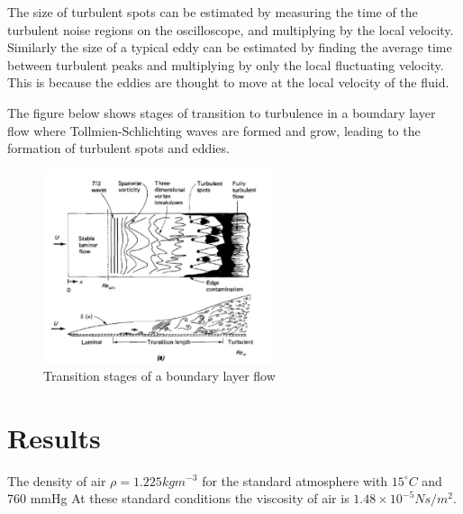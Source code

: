 \documentclass{article}
\begin{document}
The size of turbulent spots can be estimated by measuring the time of the turbulent noise regions on the oscilloscope, and multiplying by the local velocity.
Similarly the size of a typical eddy can be estimated by finding the average time between turbulent peaks and multiplying by only the local fluctuating velocity.
This is because the eddies are thought to move at the local velocity of the fluid. %

The figure below shows stages of transition to turbulence in a boundary layer flow where Tollmien-Schlichting waves are formed and grow, leading to the formation of turbulent spots and eddies.
\begin{figure}[H]
    \centering
    \includegraphics[width=0.6\textwidth]{transition_stages.jpg}
    \caption{Transition stages of a boundary layer flow \cite{textbook}}
    \label{fig:transition_stages}
\end{figure}


\section{Results}

The density of air $\rho = 1.225kgm^{-3}$ for the standard atmosphere with $15^\circ C$ and 760 mmHg
At these standard conditions the viscosity of air is $1.48 \times 10^{-5} Ns/m^2$.
\end{document}
